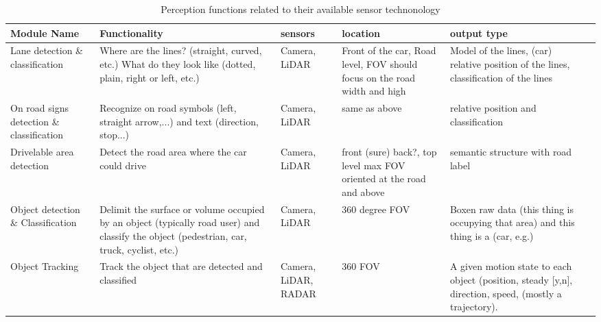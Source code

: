 \begin{table}[htbp]
\begin{tabularx}{\textwidth}{ |Y|Y|Y|Y|Y|Y| }
\hline
Module Name & Functionality & sensors & location & output type\\
\hline \hline \hline

Lane detection \& classification & Where are the lines? (straight, curved, etc.) What do they look like (dotted, plain, right or left, etc.) & Camera, LiDAR & Front of the car, Road level, FOV should focus on the road width and high & Model of the lines, (car) relative position of the lines, classification of the lines \\
\hline \hline

On road signs detection \& classification & Recognize on road symbols (left, straight arrow,...) and text (direction, stop...) & Camera, LiDAR & same as above & relative position and classification  \\
\hline \hline

Drivelable area detection & Detect the road area where the car could drive & Camera, LiDAR & front (sure) back?, top level max FOV oriented at the road and above &  semantic structure with road label  \\
\hline \hline

Object detection \& Classification & Delimit the surface or volume occupied by an object (typically road user) and classify the object (pedestrian, car, truck, cyclist, etc.) & Camera, LiDAR & 360 degree FOV & Boxen raw data (this thing is occupying that area) and this thing is a (car, e.g.)\\
\hline \hline

Object Tracking & Track the object that are detected and classified & Camera, LiDAR, RADAR & 360 FOV &  A given motion state to each object (position, steady [y,n], direction, speed, (mostly a trajectory). \\

\hline
\end{tabularx}
\caption{Perception functions related to their available sensor technonology}
\label{table:function_sensors}
\end{table}